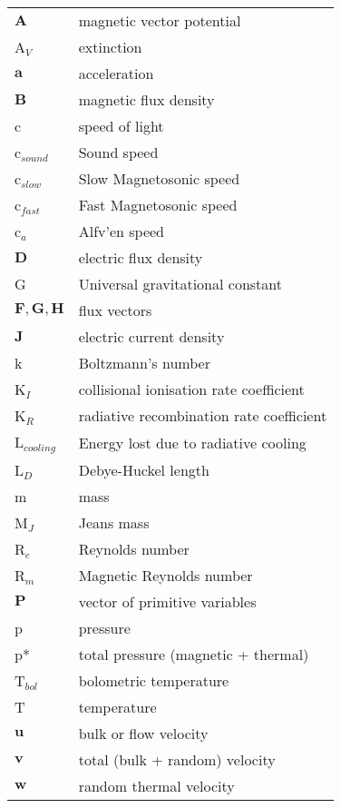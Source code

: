\begin{longtable}{l l}
$\mathbf{A}$  &  magnetic vector potential\\
A$_V$  &  extinction\\
$\mathbf{a}$  &  acceleration\\
$\mathbf{B}$  &  magnetic flux density\\
c  &  speed of light\\
c$_{sound}$  &  Sound speed\\
c$_{slow}$  &  Slow Magnetosonic speed\\
c$_{fast}$  &  Fast Magnetosonic speed\\
c$_a$  &  Alfv\a'en speed\\
$\mathbf{D}$  &  electric flux density\\
G  &  Universal gravitational constant\\
$\mathbf{F,G,H}$  &  flux vectors\\
$\mathbf{J}$  &  electric current density\\
k  &  Boltzmann's number\\
K$_I$  &  collisional ionisation rate coefficient\\
K$_R$  &  radiative recombination rate coefficient\\
L$_{cooling}$  &  Energy lost due to radiative cooling\\
L$_D$  &  Debye-Huckel length\\
m  &  mass\\
M$_J$  &  Jeans mass\\
R$_e$  &  Reynolds number\\
R$_m$  &  Magnetic Reynolds number\\
$\mathbf{P}$  &  vector of primitive variables\\
p  &  pressure\\
p*  &  total pressure (magnetic + thermal)\\
T$_{bol}$  &  bolometric temperature\\
T  &  temperature\\
$\mathbf{u}$  &  bulk or flow velocity\\
$\mathbf{v}$  &  total (bulk + random) velocity\\
$\mathbf{w}$  &  random thermal velocity
\end{longtable}
